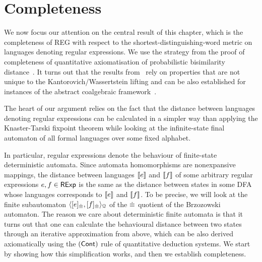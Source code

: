 \section{Completeness}\label{c2:sec:completeness}
We now focus our attention on the central result of this chapter, which is the completeness of \textsf{REG} with respect to the shortest-distinguishing-word metric on languages denoting regular expressions. We use the strategy from the proof of completeness of quantitative axiomatisation of probabilistic bisimilarity distance~\cite{Bacci:2018:Bisimilarity}. It turns out that the results from~\cite{Bacci:2018:Bisimilarity} rely on properties that are not unique to the Kantorovich/Wassertstein lifting and can be also established for instances of the abstract coalgebraic framework~\cite{Baldan:2018:Coalgebraic}.

The heart of our argument relies on the fact that the distance between languages denoting regular expressions can be calculated in a simpler way than applying the Knaster-Tarski fixpoint theorem while looking at the infinite-state final automaton of all formal languages over some fixed alphabet. 

In particular, regular expressions denote the behaviour of finite-state deterministic automata. Since automata homomorphisms are nonexpansive mappings, the distance between languages $\left\llbracket{e}\right\rrbracket$ and $\left\llbracket{f}\right\rrbracket$ of some arbitrary regular expressions $e, f \in \mathsf{RExp}$ is the same as the distance between states in some DFA whose languages corresponds to $\left\llbracket{e}\right\rrbracket$ and $\left\llbracket{f}\right\rrbracket$. To be precise, we will look at the finite subautomaton $\langle [e]_{{\mathrel{\dot\equiv}}}, [f]_{{\mathrel{\dot\equiv}}} \rangle_{\mathcal{Q}}$ of the ${\mathrel{\dot\equiv}}$ quotient of the Brzozowski automaton. The reason we care about deterministic finite automata is that it turns out that one can calculate the behavioural distance between two states through an iterative approximation from above, which can be also derived axiomatically using the $(\textsf{Cont})$ rule of quantitative deduction systems. We start by showing how this simplification works, and then we establish completeness.
